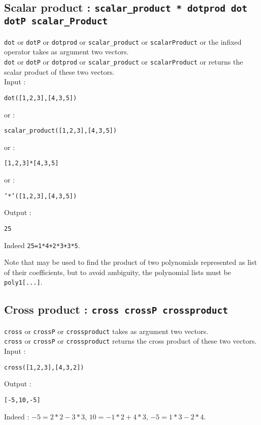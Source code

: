 \documentclass[a4paper,11pt]{book}
\begin{document}
\subsection{Scalar product  : {\tt scalar\_product * dotprod dot dotP
scalar\_Product}} 
{\tt dot} or {\tt dotP} or {\tt dotprod} or {\tt scalar\_product} or 
{\tt scalarProduct} or the infixed operator {\tt *} takes as argument 
two vectors.\\
{\tt dot} or {\tt dotP} or {\tt dotprod} or {\tt scalar\_product} or 
{\tt scalarProduct} or {\tt *} returns the  scalar product of these
two 
vectors.\\
Input :
\begin{center}{\tt dot([1,2,3],[4,3,5])}\end{center}
or : 
\begin{center}{\tt scalar\_product([1,2,3],[4,3,5])}\end{center}
or :
\begin{center}{\tt [1,2,3]*[4,3,5]}\end{center}
or :
\begin{center}{\tt '*'([1,2,3],[4,3,5])}\end{center}
Output :
\begin{center}{\tt 25}\end{center}
Indeed {\tt 25=1*4+2*3+3*5}.

Note that {\tt *} may be used to find the product of two polynomials
represented as list of their coefficients, but to avoid ambiguity,
the polynomial lists must be {\tt poly1[...]}.

\subsection{Cross product : {\tt cross crossP
crossproduct}}
{\tt cross} or {\tt crossP} or {\tt crossproduct} takes as argument 
two vectors.\\
{\tt cross} or {\tt crossP} or {\tt crossproduct} returns the cross
product
of these two vectors.\\
Input :
\begin{center}{\tt cross([1,2,3],[4,3,2])}\end{center}
Output :
\begin{center}{\tt [-5,10,-5]}\end{center}
Indeed : 
$-5=2*2-3*3$, $ 10=-1*2+4*3$, $ -5=1*3-2*4$.
\end{document}
